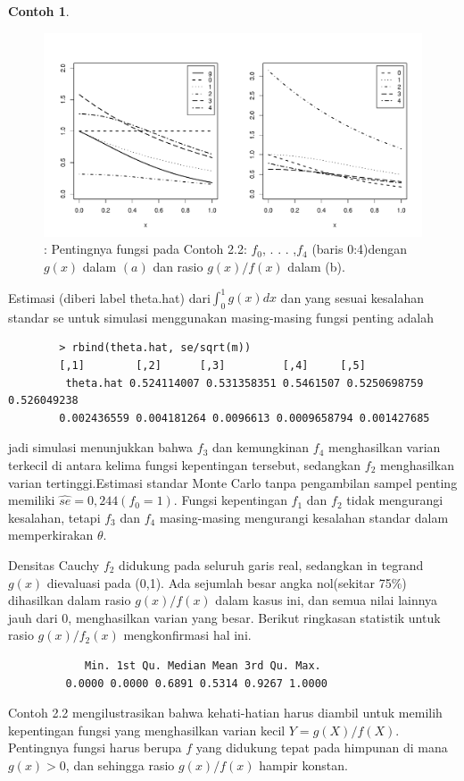 \documentclass[a4paper,12pt]{article}
\theoremstyle{definition}
\newtheorem{example}{Contoh}[section]
\begin{document}
\begin{example}
        \begin{figure}[h]
        \centering
        \includegraphics [width=\textwidth]{gb/K5G1}
        \caption{: Pentingnya fungsi pada Contoh 2.2: $f_{0}$, . . . ,$ f_{4}$ (baris 0:4)dengan $g(x)$ dalam $(a)$ dan rasio $g(x)/f(x)$ dalam (b).}
        \label{fig:my_label}
        \end{figure}
        Estimasi (diberi label theta.hat) dari$\int_{0}^{1}g(x)dx$ dan yang sesuai kesalahan standar se untuk simulasi menggunakan masing-masing fungsi penting adalah
        \begin{lstlisting}
        > rbind(theta.hat, se/sqrt(m))
        [,1]        [,2]      [,3]         [,4]     [,5]
         theta.hat 0.524114007 0.531358351 0.5461507 0.5250698759 0.526049238
        0.002436559 0.004181264 0.0096613 0.0009658794 0.001427685
        \end{lstlisting}
        jadi simulasi menunjukkan bahwa $f_{3}$ dan kemungkinan $f_{4}$ menghasilkan varian terkecil di antara kelima fungsi kepentingan tersebut, sedangkan $f_{2}$ menghasilkan varian tertinggi.Estimasi standar Monte Carlo tanpa pengambilan sampel penting memiliki $\widehat{se}=0,244(f_{0}=1)$. Fungsi kepentingan $f_{1}$ dan $f_{2}$ tidak mengurangi kesalahan, tetapi $f_{3}$ dan $f_{4}$ masing-masing mengurangi kesalahan standar dalam memperkirakan $\theta$.
        
        Densitas Cauchy $f_{2}$ didukung pada seluruh garis real, sedangkan in tegrand $g(x)$ dievaluasi pada (0,1). Ada sejumlah besar angka nol(sekitar 75\%) dihasilkan dalam rasio $g(x)/f(x)$ dalam kasus ini, dan semua nilai lainnya jauh dari 0, menghasilkan varian yang besar. Berikut ringkasan statistik untuk rasio $g(x)/f_{2}(x)$ mengkonfirmasi hal ini.
        \begin{lstlisting}
            Min. 1st Qu. Median Mean 3rd Qu. Max.
         0.0000 0.0000 0.6891 0.5314 0.9267 1.0000
        \end{lstlisting} 
        Contoh 2.2 mengilustrasikan bahwa kehati-hatian harus diambil untuk memilih kepentingan fungsi yang menghasilkan varian kecil $Y = g(X)/f(X)$. Pentingnya fungsi harus berupa $f$ yang didukung tepat pada himpunan di mana $g(x) > 0$, dan sehingga rasio $g(x)/f(x)$ hampir konstan.
    \end{example}
\end{document}
